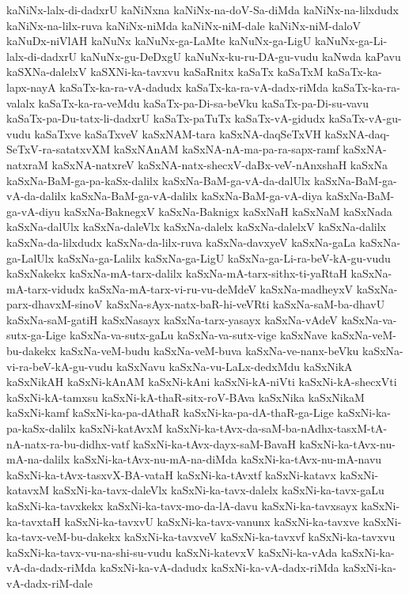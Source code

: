 {kaNiNx-lalx-di-dadxrU
kaNiNxna
kaNiNx-na-doV-Sa-diMda
kaNiNx-na-lilxdudx
kaNiNx-na-lilx-ruva
kaNiNx-niMda
kaNiNx-niM-dale
kaNiNx-niM-daloV
kaNuDx-niVlAH
kaNuNx
kaNuNx-ga-LaMte
kaNuNx-ga-LigU
kaNuNx-ga-Li-lalx-di-dadxrU
kaNuNx-gu-DeDxgU
kaNuNx-ku-ru-DA-gu-vudu
kaNwda
kaPavu
kaSXNa-dalelxV
kaSXNi-ka-tavxvu
kaSaRnitx
kaSaTx
kaSaTxM
kaSaTx-ka-lapx-nayA
kaSaTx-ka-ra-vA-dadudx
kaSaTx-ka-ra-vA-dadx-riMda
kaSaTx-ka-ra-valalx
kaSaTx-ka-ra-veMdu
kaSaTx-pa-Di-sa-beVku
kaSaTx-pa-Di-su-vavu
kaSaTx-pa-Du-tatx-li-dadxrU
kaSaTx-paTuTx
kaSaTx-vA-gidudx
kaSaTx-vA-gu-vudu
kaSaTxve
kaSaTxveV
kaSxNAM-tara
kaSxNA-daqSeTxVH
kaSxNA-daq-SeTxV-ra-satatxvXM
kaSxNAnAM
kaSxNA-nA-ma-pa-ra-sapx-ramf
kaSxNA-natxraM
kaSxNA-natxreV
kaSxNA-natx-shecxV-daBx-veV-nAnxshaH
kaSxNa
kaSxNa-BaM-ga-pa-kaSx-dalilx
kaSxNa-BaM-ga-vA-da-dalUlx
kaSxNa-BaM-ga-vA-da-dalilx
kaSxNa-BaM-ga-vA-dalilx
kaSxNa-BaM-ga-vA-diya
kaSxNa-BaM-ga-vA-diyu
kaSxNa-BaknegxV
kaSxNa-Baknigx
kaSxNaH
kaSxNaM
kaSxNada
kaSxNa-dalUlx
kaSxNa-daleVlx
kaSxNa-dalelx
kaSxNa-dalelxV
kaSxNa-dalilx
kaSxNa-da-lilxdudx
kaSxNa-da-lilx-ruva
kaSxNa-davxyeV
kaSxNa-gaLa
kaSxNa-ga-LalUlx
kaSxNa-ga-Lalilx
kaSxNa-ga-LigU
kaSxNa-ga-Li-ra-beV-kA-gu-vudu
kaSxNakekx
kaSxNa-mA-tarx-dalilx
kaSxNa-mA-tarx-sithx-ti-yaRtaH
kaSxNa-mA-tarx-vidudx
kaSxNa-mA-tarx-vi-ru-vu-deMdeV
kaSxNa-madheyxV
kaSxNa-parx-dhavxM-sinoV
kaSxNa-sAyx-natx-baR-hi-veVRti
kaSxNa-saM-ba-dhavU
kaSxNa-saM-gatiH
kaSxNasayx
kaSxNa-tarx-yasayx
kaSxNa-vAdeV
kaSxNa-va-sutx-ga-Lige
kaSxNa-va-sutx-gaLu
kaSxNa-va-sutx-vige
kaSxNave
kaSxNa-veM-bu-dakekx
kaSxNa-veM-budu
kaSxNa-veM-buva
kaSxNa-ve-nanx-beVku
kaSxNa-vi-ra-beV-kA-gu-vudu
kaSxNavu
kaSxNa-vu-LaLx-dedxMdu
kaSxNikA
kaSxNikAH
kaSxNi-kAnAM
kaSxNi-kAni
kaSxNi-kA-niVti
kaSxNi-kA-shecxVti
kaSxNi-kA-tamxsu
kaSxNi-kA-thaR-sitx-roV-BAva
kaSxNika
kaSxNikaM
kaSxNi-kamf
kaSxNi-ka-pa-dAthaR
kaSxNi-ka-pa-dA-thaR-ga-Lige
kaSxNi-ka-pa-kaSx-dalilx
kaSxNi-katAvxM
kaSxNi-ka-tAvx-da-saM-ba-nAdhx-tasxM-tA-nA-natx-ra-bu-didhx-vatf
kaSxNi-ka-tAvx-dayx-saM-BavaH
kaSxNi-ka-tAvx-nu-mA-na-dalilx
kaSxNi-ka-tAvx-nu-mA-na-diMda
kaSxNi-ka-tAvx-nu-mA-navu
kaSxNi-ka-tAvx-tasxvX-BA-vataH
kaSxNi-ka-tAvxtf
kaSxNi-katavx
kaSxNi-katavxM
kaSxNi-ka-tavx-daleVlx
kaSxNi-ka-tavx-dalelx
kaSxNi-ka-tavx-gaLu
kaSxNi-ka-tavxkekx
kaSxNi-ka-tavx-mo-da-lA-davu
kaSxNi-ka-tavxsayx
kaSxNi-ka-tavxtaH
kaSxNi-ka-tavxvU
kaSxNi-ka-tavx-vanunx
kaSxNi-ka-tavxve
kaSxNi-ka-tavx-veM-bu-dakekx
kaSxNi-ka-tavxveV
kaSxNi-ka-tavxvf
kaSxNi-ka-tavxvu
kaSxNi-ka-tavx-vu-na-shi-su-vudu
kaSxNi-katevxV
kaSxNi-ka-vAda
kaSxNi-ka-vA-da-dadx-riMda
kaSxNi-ka-vA-dadudx
kaSxNi-ka-vA-dadx-riMda
kaSxNi-ka-vA-dadx-riM-dale
}
